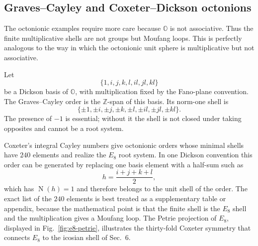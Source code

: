 \documentclass[12pt,oneside,english]{amsart}
\numberwithin{equation}{section}
\numberwithin{figure}{section}
\numberwithin{table}{section}
\theoremstyle{plain}
\theoremstyle{definition}
\theoremstyle{remark}
\newcommand{\ZZ}{\mathbb Z}
\newcommand{\Oct}{\mathbb O}
\newcommand{\Norm}{\operatorname{N}}
\begin{document}
\subsection{Graves--Cayley and Coxeter--Dickson octonions}

The octonionic examples require more care because \(\Oct\) is not associative. Thus the finite multiplicative shells are not groups but Moufang loops. This is perfectly analogous to the way in which the octonionic unit sphere is multiplicative but not associative.

Let
\begin{equation}
\{1,i,j,k,l,il,jl,kl\}
\label{eq:octonion-dickson-basis}
\end{equation}
be a Dickson basis of \(\Oct\), with multiplication fixed by the Fano-plane convention. The Graves--Cayley order is the \(\ZZ\)-span of this basis. Its norm-one shell is
\begin{equation}
\{\pm1,\pm i,\pm j,\pm k,\pm l,\pm il,\pm jl,\pm kl\}.
\label{eq:cayley-graves-units}
\end{equation}
The presence of \(-1\) is essential; without it the shell is not closed under taking opposites and cannot be a root system.

Coxeter's integral Cayley numbers \cite{Co46} give octonionic orders whose minimal shells have \(240\) elements and realize the \(E_8\) root system. In one Dickson convention this order can be generated by replacing one basis element with a half-sum such as
\begin{equation}
h=\frac{i+j+k+l}{2},
\label{eq:coxeter-half-sum}
\end{equation}
which has \(\Norm(h)=1\) and therefore belongs to the unit shell of the order.
The exact list of the \(240\) elements is best treated as a supplementary table or appendix, because the mathematical point is that the finite shell is the \(E_8\) shell and the multiplication gives a Moufang loop. The Petrie projection of $E_8$, displayed in Fig.~\ref{fig:e8-petrie}, illustrates the thirty-fold Coxeter symmetry that connects $E_8$ to the icosian shell of Sec.~6.
\end{document}
